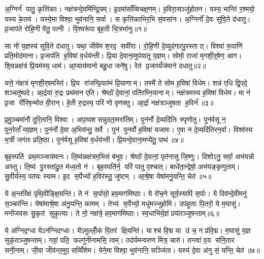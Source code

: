 \setcounter{anuvakam}{0}
अ॒ग्निर्न॑ पातु॒ कृत्ति॑काः। नक्ष॑त्रन्दे॒वमि॑न्द्रि॒यम्। इ॒दमा॑साँव्विचक्ष॒णम्। ह॒विरा॒सञ्जु॑होतन। यस्य॒ भान्ति॑ र॒श्मयो॒ यस्य के॒तव॑। यस्ये॒मा विश्वा॒ भुव॑नानि॒ सर्वा। स कृत्ति॑काभिर॒भि सं॒वसा॑नः। अ॒ग्निर्नो॑ दे॒वः सु॑वि॒ते द॑धातु। प्र॒जाप॑ते रोहि॒णी वे॑तु॒ पत्नी। वि॒श्वरू॑पा बृह॒ती चि॒त्रभा॑नुः॥१॥

सा नो॑ य॒ज्ञस्य॑ सुवि॒ते द॑धातु। यथा॒ जीवे॑म श॒रद॒ सवी॑राः। रो॒हि॒णी दे॒व्युद॑गात्पु॒रस्तात्। विश्वा॑ रू॒पाणि॑ प्रति॒मोद॑माना। प्र॒जाप॑ति ह॒विषा॑ व॒र्धय॑न्ती। प्रि॒या दे॒वाना॒मुप॑यातु य॒ज्ञम्। सोमो॒ राजा॑ मृगशी॒र्॒षेण॒ आग\sn{}। शि॒वन्नक्ष॑त्रं प्रि॒यम॑स्य॒ धाम॑। आ॒प्याय॑मानो बहु॒धा जने॑षु। रेत॑ प्र॒जाय्यँज॑माने दधातु॥२॥

यत्ते॒ न॑क्षत्रं मृगशी॒र्‌षमस्ति॑। प्रि॒य रा॑जन्प्रि॒यत॑मं प्रि॒याणाम्। तस्मै॑ ते सोम ह॒विषा॑ विधेम। शन्न॑ एधि द्वि॒पदे॒ शञ्चतु॑ष्पदे। आ॒र्द्रया॑ रु॒द्रः प्रथ॑मान एति। श्रेष्ठो॑ दे॒वानां॒ पति॑रघ्नि॒यानाम्। नक्ष॑त्रमस्य ह॒विषा॑ विधेम। मा न॑ प्र॒जा री॑रिष॒न्मोत वी॒रान्। हे॒ती रु॒द्रस्य॒ परि॑ णो वृणक्तु। आ॒र्द्रा नक्ष॑त्रञ्जुषता ह॒विर्न॑॥३॥

प्र॒मु॒ञ्चमा॑नौ दुरि॒तानि॒ विश्वा। अपा॒घशसन्नुदता॒मरा॑तिम्। पुन॑र्नो दे॒व्यदि॑तिः स्पृणोतु। पुन॑र्वसू न॒ पुन॒रेताँय्य॒ज्ञम्। पुन॑र्नो दे॒वा अ॒भिय॑न्तु॒ सर्वे। पुन॑ पुनर्वो ह॒विषा॑ यजामः। ए॒वा न दे॒व्यदि॑तिरन॒र्वा। विश्व॑स्य भ॒र्त्री जग॑तः प्रति॒ष्ठा। पुन॑र्वसू ह॒विषा॑ व॒र्धय॑न्ती। प्रि॒यन्दे॒वाना॒मप्ये॑तु॒ पाथ॑॥४॥

बृह॒स्पति॑ प्रथ॒मञ्जाय॑मानः। ति॒ष्य॑न्नक्ष॑त्रम॒भिसं ब॑भूव। श्रेष्ठो॑ दे॒वानां॒ पृत॑नासु जि॒ष्णुः। दिशोऽनु॒ सर्वा॒ अभ॑यन्नो अस्तु। ति॒ष्य॑ पु॒रस्ता॑दु॒त म॑ध्य॒तो न॑। बृह॒स्पति॑र्न॒ परि॑ पातु प॒श्चात्। बाधे॑ता॒न्द्वेषो॒ अभ॑यङ्कृणुताम्। सु॒वीर्य॑स्य॒ पत॑यः स्याम। इ॒द स॒र्पेभ्यो॑ ह॒विर॑स्तु॒ जुष्टम्। आ॒श्रे॒षा येषा॑मनु॒यन्ति॒ चेत॑॥५॥

ये अ॒न्तरि॑क्षं पृथि॒वीङ्क्षि॒यन्ति॑। ते न॑ स॒र्पासो॒ हव॒माग॑मिष्ठाः। ये रो॑च॒ने सूर्य॒स्यापि॑ स॒र्पाः। ये दिव॑न्दे॒वीमनु॑ स॒ञ्चर॑न्ति। येषा॑माश्रे॒षा अ॑नु॒यन्ति॒ कामम्। तेभ्य॑ स॒र्पेभ्यो॒ मधु॑मज्जुहोमि। उप॑हूताः पि॒तरो॒ ये म॒घासु॑। मनो॑जवसः सु॒कृत॑ सुकृ॒त्याः। ते नो॒ नक्ष॑त्रे॒ हव॒माग॑मिष्ठाः। स्व॒धाभि॑र्य॒ज्ञं प्रय॑तञ्जुषन्ताम्॥६॥

ये अ॑ग्निद॒ग्धा येऽन॑ग्निदग्धाः। ये॑ऽमुल्लोँ॒कं पि॒तर॑ क्षि॒यन्ति॑। याश्च॑ वि॒द्म या उ॑ च॒ न प्र॑वि॒द्म। म॒घासु॑ य॒ज्ञ सुकृ॑तञ्जुषन्ताम्। गवां॒ पति॒ फल्गु॑नीनामसि॒ त्वम्। तद॑र्यमन्वरुण मित्र॒ चारु॑। तन्त्वा॑ व॒य स॑नि॒तार सनी॒नाम्। जी॒वा जीव॑न्त॒मुप॒ सव्विँ॑शेम। येने॒मा विश्वा॒ भुव॑नानि॒ सञ्जि॑ता। यस्य॑ दे॒वा अ॑नु सं॒ यन्ति॒ चेत॑॥७॥

